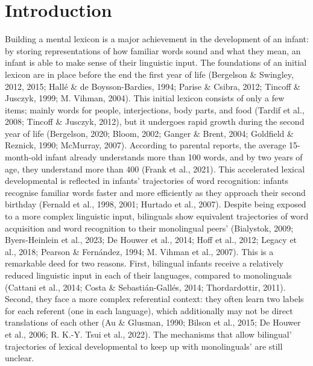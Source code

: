 \documentclass[
  12pt,
  b5paperpaper,
  twoside]{scrreprt}
\begin{document}
\hypertarget{introduction-2}{%
\section{Introduction}\label{introduction-2}}

Building a mental lexicon is a major achievement in the development of
an infant: by storing representations of how familiar words sound and
what they mean, an infant is able to make sense of their linguistic
input. The foundations of an initial lexicon are in place before the end
the first year of life (Bergelson \& Swingley, 2012, 2015; Hallé \& de
Boysson-Bardies, 1994; Parise \& Csibra, 2012; Tincoff \& Jusczyk, 1999;
M. Vihman, 2004). This initial lexicon consists of only a few items;
mainly words for people, interjections, body parts, and food (Tardif et
al., 2008; Tincoff \& Jusczyk, 2012), but it undergoes rapid growth
during the second year of life (Bergelson, 2020; Bloom, 2002; Ganger \&
Brent, 2004; Goldfield \& Reznick, 1990; McMurray, 2007). According to
parental reports, the average 15-month-old infant already understands
more than 100 words, and by two years of age, they understand more than
400 (Frank et al., 2021). This accelerated lexical developmental is
reflected in infants' trajectories of word recognition: infants
recognise familiar words faster and more efficiently as they approach
their second birthday (Fernald et al., 1998, 2001; Hurtado et al.,
2007). Despite being exposed to a more complex linguistic input,
bilinguals show equivalent trajectories of word acquisition and word
recognition to their monolingual peers' (Bialystok, 2009; Byers-Heinlein
et al., 2023; De Houwer et al., 2014; Hoff et al., 2012; Legacy et al.,
2018; Pearson \& Fernández, 1994; M. Vihman et al., 2007). This is a
remarkable deed for two reasons. First, bilingual infants receive a
relatively reduced linguistic input in each of their languages, compared
to monolinguals (Cattani et al., 2014; Costa \& Sebastián-Gallés, 2014;
Thordardottir, 2011). Second, they face a more complex referential
context: they often learn two labels for each referent (one in each
language), which additionally may not be direct translations of each
other (Au \& Glusman, 1990; Bilson et al., 2015; De Houwer et al., 2006;
R. K.-Y. Tsui et al., 2022). The mechanisms that allow bilingual'
trajectories of lexical developmental to keep up with monolinguals' are
still unclear.
\end{document}
